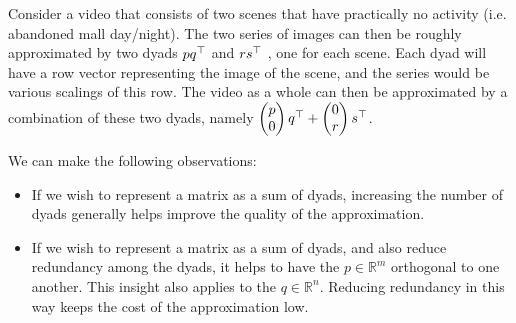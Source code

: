 \documentclass[12pt]{article}
\begin{document}
\begin{example}
Consider a video that consists of two scenes that have practically no activity (i.e. abandoned mall day/night). The two series of images can then be roughly approximated by two dyads $pq^\top$ and $rs^\top$ , one for each scene. Each dyad will have a row vector representing the image of the scene, and the series would be various scalings of this row. The video as a whole can then be approximated by a combination of these two dyads, namely $\begin{pmatrix} p \\ 0 \end{pmatrix}q^\top + \begin{pmatrix} 0 \\ r \end{pmatrix}s^\top$.
\end{example}

We can make the following observations:
\begin{itemize}
    \item If we wish to represent a matrix as a sum of dyads, increasing the number of dyads generally helps improve the quality of the approximation.
    \item If we wish to represent a matrix as a sum of dyads, and also reduce redundancy among the dyads, it helps to have the $p \in \mathbb{R}^{m}$ orthogonal to one another. This insight also applies to the $q \in \mathbb{R}^{n}$. Reducing redundancy in this way keeps the cost of the approximation low.
\end{itemize}
\end{document}
